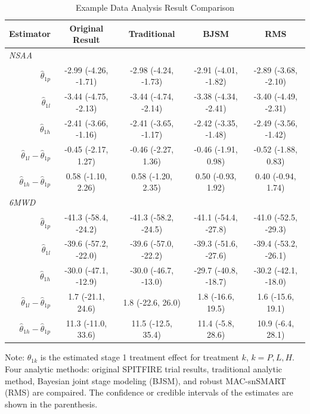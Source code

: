\begin{table} 
\caption{\label{tab:comp} Example Data Analysis Result Comparison}
\begin{center}
\begin{tabular}{ccccc}
Estimator &  Original Result &  Traditional &   BJSM &  RMS  \tabularnewline
\hline
\multicolumn{1}{l}{\textit{NSAA}} &&&&\\
\multicolumn{1}{r}{$\hat{\theta}_{1p}$} &  -2.99 (-4.26, -1.71) &  -2.98 (-4.24, -1.73) &  -2.91 (-4.01, -1.82) &  -2.89 (-3.68, -2.10) \tabularnewline 

\multicolumn{1}{r}{$\hat{\theta}_{1l}$}  &  -3.44 (-4.75, -2.13) &  -3.44 (-4.74, -2.14) &  -3.38 (-4.34, -2.41) &  -3.40 (-4.49, -2.31)  \tabularnewline

\multicolumn{1}{r}{$\hat{\theta}_{1h}$} &  -2.41 (-3.66, -1.16) &  -2.41 (-3.65, -1.17) &   -2.42 (-3.35, -1.48) &  -2.49 (-3.56, -1.42) \tabularnewline

\multicolumn{1}{r}{$\hat{\theta}_{1l} - \hat{\theta}_{1p}$} &  -0.45 (-2.17, 1.27) &  -0.46 (-2.27, 1.36) &  -0.46 (-1.91, 0.98) &  -0.52 (-1.88, 0.83)   \tabularnewline
\multicolumn{1}{r}{$\hat{\theta}_{1h} - \hat{\theta}_{1p}$} &  	0.58 (-1.10, 2.26) &  0.58 (-1.20, 2.35) &  0.50 (-0.93, 1.92) &  0.40 (-0.94, 1.74) \tabularnewline
\hline
\multicolumn{1}{l}{\textit{6MWD}} &&&&\\
\multicolumn{1}{r}{$\hat{\theta}_{1p}$} &  -41.3 (-58.4, -24.2) &  -41.3 (-58.2, -24.5) &  -41.1 (-54.4, -27.8) &  -41.0 (-52.5, -29.3) \tabularnewline 

\multicolumn{1}{r}{$\hat{\theta}_{1l}$} &  -39.6 (-57.2, -22.0) &  -39.6 (-57.0, -22.2) &  -39.3 (-51.6, -27.6) &  -39.4 (-53.2, -26.1)  \tabularnewline

\multicolumn{1}{r}{$\hat{\theta}_{1h}$} &  -30.0 (-47.1, -12.9) &  -30.0 (-46.7, -13.0) &   -29.7 (-40.8, -18.7) &  -30.2 (-42.1, -18.0) \tabularnewline

\multicolumn{1}{r}{$\hat{\theta}_{1l} - \hat{\theta}_{1p}$} &  1.7 (-21.1, 24.6) &  1.8 (-22.6, 26.0) &  1.8 (-16.6, 19.5) &  1.6 (-15.6, 19.1)    \tabularnewline
\multicolumn{1}{r}{$\hat{\theta}_{1h} - \hat{\theta}_{1p}$} &  11.3 (-11.0, 33.6) &  11.5 (-12.5, 35.4) &  11.4 (-5.8, 28.6) &  10.9 (-6.4, 28.1) \tabularnewline
\hline
\end{tabular}
\end{center}
\begin{tablenotes}
      \small
      \item Note: $\hat{\theta}_{1k}$ is the estimated stage 1 treatment effect for treatment $k$, $k = P,L,H$. Four analytic methods: original SPITFIRE trial results, traditional analytic method, Bayesian joint stage modeling (BJSM), and robust MAC-snSMART (RMS) are compaired. The confidence or credible intervals of the estimates are shown in the parenthesis.
\end{tablenotes}
\end{table}

